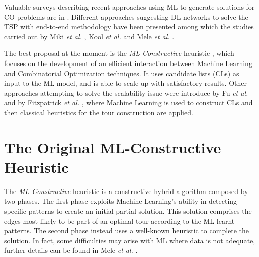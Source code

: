 \documentclass{article}
\begin{document}
Valuable surveys describing recent approaches using ML to generate solutions for CO problems are in \cite{mele_survey, survey}.
Different approaches suggesting DL networks to solve the TSP with end-to-end methodology have been presented among which the studies carried out by Miki \emph{et al.} \cite{image_for_TSP}, Kool \emph{et al.} \cite{attention_for_VRP} and Mele \emph{et al.} \cite{mele_rl}.

The best proposal at the moment is the \emph{ML-Constructive} heuristic \cite{mele:gambardella:montemanni}, which focuses on the development of an efficient interaction between Machine Learning and Combinatorial Optimization techniques. 
It uses candidate lists (CLs) as input to the ML model, and is able to scale up with satisfactory results.
Other approaches attempting to solve the scalability issue were introduce by Fu \emph{et al.} \cite{generalize} and by Fitzpatrick \emph{et al.} \cite{ml_for_cl}, where Machine Learning is used to construct CLs and then classical heuristics for the tour construction are applied.

\section{The Original ML-Constructive Heuristic} \label{method}
The \emph{ML-Constructive} heuristic is a constructive hybrid algorithm composed by two phases. 
The first phase exploits Machine Learning's ability in detecting specific patterns to create an initial partial solution.
This solution comprises the edges most likely to be part of an optimal tour according to the ML learnt patterns.
The second phase instead uses a well-known heuristic to complete the solution.
In fact, some difficulties may arise with ML where data is not adequate, further details can be found in Mele \emph{et al.} \cite{mele:gambardella:montemanni}. 

\vspace{5 pt}
\end{document}
